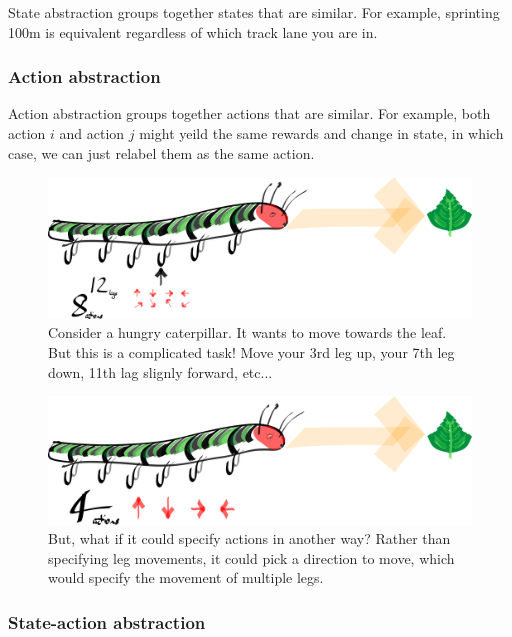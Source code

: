 State abstraction groups together states that are similar. For example,
sprinting 100m is equivalent regardless of which track lane you are in.



\subsubsection{Action abstraction}

Action abstraction groups together actions that are similar. For
example, both action $i$ and action $j$ might yeild the same rewards and change in state,
in which case, we can just relabel them as the same action.

\begin{figure}[h!]
\centering
\includegraphics[width=\textwidth,height=0.25\textheight]{../../pictures/drawings/hungry-caterpillar.png}
\caption{Consider a hungry caterpillar. It wants to move towards the leaf. But this is a complicated task! Move your 3rd leg up, your 7th leg down, 11th lag slignly forward, etc...}
\end{figure}


\begin{figure}[h!]
\centering
\includegraphics[width=\textwidth,height=0.25\textheight]{../../pictures/drawings/full-caterpillar.png}
\caption{But, what if it could specify actions in another way? Rather than specifying leg movements, it could pick a direction to move, which would specify the movement of multiple legs.}
\end{figure}

\subsubsection{State-action abstraction}

